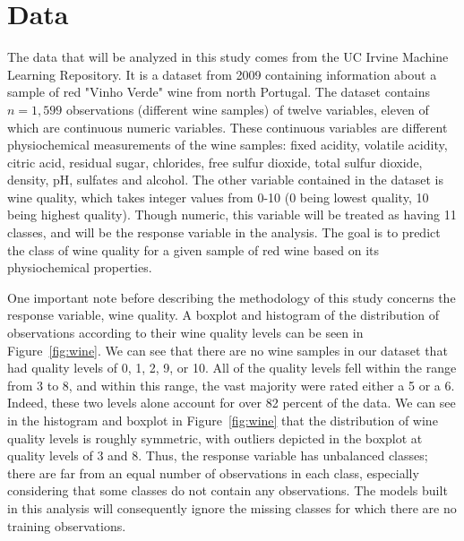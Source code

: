 \documentclass[12pt]{article}
\begin{document}
\section{Data}
\label{sec:data}

The data that will be analyzed in this study comes from the UC Irvine Machine Learning 
Repository.  It is a dataset from 2009 containing information about a sample of red 
"Vinho Verde" wine from north Portugal.  The dataset contains $n = 1,599$ observations 
(different wine samples) of twelve variables, eleven of which are continuous numeric 
variables.  These continuous variables are different physiochemical measurements of the 
wine samples: fixed acidity, volatile acidity, citric acid, residual sugar, chlorides, 
free sulfur dioxide, total sulfur dioxide, density, pH, sulfates and alcohol.  The other 
variable contained in the dataset is wine quality, which takes integer values from 0-10 
(0 being lowest quality, 10 being highest quality).  Though numeric, this variable will 
be treated as having 11 classes, and will be the response variable in the analysis.  The 
goal is to predict the class of wine quality for a given sample of red wine based on its 
physiochemical properties.  

One important note before describing the methodology of this study concerns the response 
variable, wine quality.  A boxplot and histogram of the distribution of observations 
according to their wine quality levels can be seen in Figure~\ref{fig:wine}.  We can see 
that there are no wine samples in our dataset that had quality levels of 0, 1, 2, 9, or 
10.  All of the quality levels fell within the range from 3 to 8, and within this range, 
the vast majority were rated either a 5 or a 6.  Indeed, these two levels alone account 
for over 82 percent of the data.  We can see in the histogram and boxplot in 
Figure~\ref{fig:wine} that the distribution of wine quality levels is roughly symmetric, 
with outliers depicted in the boxplot at quality levels of 3 and 8.  Thus, the response 
variable has unbalanced classes; there are far from an equal number of observations in 
each class, especially considering that some classes do not contain any observations.  
The models built in this analysis will consequently ignore the missing classes for which 
there are no training observations.  
\end{document}
